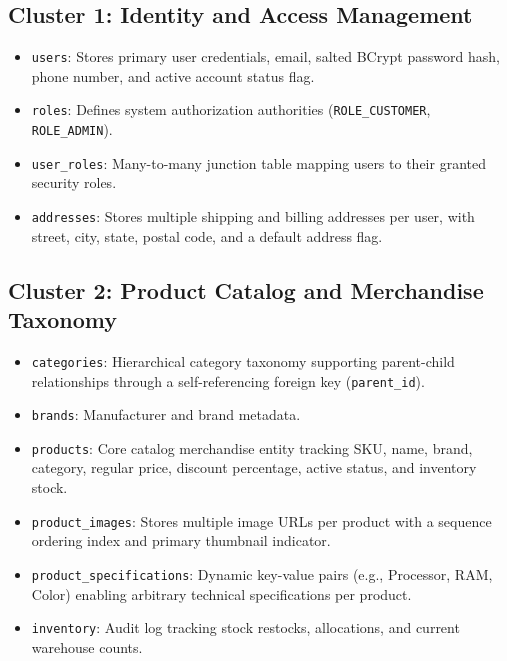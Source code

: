 \subsection{Cluster 1: Identity and Access Management}
\begin{itemize}[leftmargin=2.0em]
    \item \texttt{users}: Stores primary user credentials, email, salted BCrypt password hash, phone number, and active account status flag.
    \item \texttt{roles}: Defines system authorization authorities (\texttt{ROLE\_CUSTOMER}, \texttt{ROLE\_ADMIN}).
    \item \texttt{user\_roles}: Many-to-many junction table mapping users to their granted security roles.
    \item \texttt{addresses}: Stores multiple shipping and billing addresses per user, with street, city, state, postal code, and a default address flag.
\end{itemize}

\subsection{Cluster 2: Product Catalog and Merchandise Taxonomy}
\begin{itemize}[leftmargin=2.0em]
    \item \texttt{categories}: Hierarchical category taxonomy supporting parent-child relationships through a self-referencing foreign key (\texttt{parent\_id}).
    \item \texttt{brands}: Manufacturer and brand metadata.
    \item \texttt{products}: Core catalog merchandise entity tracking SKU, name, brand, category, regular price, discount percentage, active status, and inventory stock.
    \item \texttt{product\_images}: Stores multiple image URLs per product with a sequence ordering index and primary thumbnail indicator.
    \item \texttt{product\_specifications}: Dynamic key-value pairs (e.g., Processor, RAM, Color) enabling arbitrary technical specifications per product.
    \item \texttt{inventory}: Audit log tracking stock restocks, allocations, and current warehouse counts.
\end{itemize}

